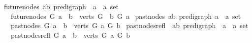 \begin{isabellebody}
\isanewline
{}\isamarkupfalse%
\ future{\isacharunderscore}{\kern0pt}nodes{\isacharcolon}{\kern0pt}{\isacharcolon}{\kern0pt}\ {\isachardoublequoteopen}{\isacharparenleft}{\kern0pt}{\isacharprime}{\kern0pt}a{\isacharcomma}{\kern0pt}{\isacharprime}{\kern0pt}b{\isacharparenright}{\kern0pt}\ pre{\isacharunderscore}{\kern0pt}digraph\ {\isasymRightarrow}\ {\isacharprime}{\kern0pt}a\ {\isasymRightarrow}\ {\isacharprime}{\kern0pt}a\ set{\isachardoublequoteclose}\isanewline
\ \ \ {\isachardoublequoteopen}future{\isacharunderscore}{\kern0pt}nodes\ G\ a\ {\isacharequal}{\kern0pt}\ {\isacharbraceleft}{\kern0pt}b\ {\isasymin}\ verts\ G{\isachardot}{\kern0pt}\ \ b\ {\isasymrightarrow}\isactrlsup {\isacharplus}{\kern0pt}\isactrlbsub G\isactrlesub \ a{\isacharbraceright}{\kern0pt}{\isachardoublequoteclose}\isanewline
\isanewline
{}\isamarkupfalse%
\ past{\isacharunderscore}{\kern0pt}nodes{\isacharcolon}{\kern0pt}{\isacharcolon}{\kern0pt}\ {\isachardoublequoteopen}{\isacharparenleft}{\kern0pt}{\isacharprime}{\kern0pt}a{\isacharcomma}{\kern0pt}{\isacharprime}{\kern0pt}b{\isacharparenright}{\kern0pt}\ pre{\isacharunderscore}{\kern0pt}digraph\ {\isasymRightarrow}{\isacharprime}{\kern0pt}a\ {\isasymRightarrow}\ {\isacharprime}{\kern0pt}a\ set{\isachardoublequoteclose}\isanewline
\ \ \ {\isachardoublequoteopen}past{\isacharunderscore}{\kern0pt}nodes\ G\ a\ {\isacharequal}{\kern0pt}\ {\isacharbraceleft}{\kern0pt}b\ {\isasymin}\ verts\ G{\isachardot}{\kern0pt}\ a\ {\isasymrightarrow}\isactrlsup {\isacharplus}{\kern0pt}\isactrlbsub G\isactrlesub \ b{\isacharbraceright}{\kern0pt}{\isachardoublequoteclose}\isanewline
\isanewline
{}\isamarkupfalse%
\ past{\isacharunderscore}{\kern0pt}nodes{\isacharunderscore}{\kern0pt}refl\ {\isacharcolon}{\kern0pt}{\isacharcolon}{\kern0pt}\ {\isachardoublequoteopen}{\isacharparenleft}{\kern0pt}{\isacharprime}{\kern0pt}a{\isacharcomma}{\kern0pt}{\isacharprime}{\kern0pt}b{\isacharparenright}{\kern0pt}\ pre{\isacharunderscore}{\kern0pt}digraph\ {\isasymRightarrow}\ {\isacharprime}{\kern0pt}a\ {\isasymRightarrow}\ {\isacharprime}{\kern0pt}a\ set{\isachardoublequoteclose}\isanewline
\ \ \ {\isachardoublequoteopen}past{\isacharunderscore}{\kern0pt}nodes{\isacharunderscore}{\kern0pt}refl\ G\ a\ {\isacharequal}{\kern0pt}\ {\isacharbraceleft}{\kern0pt}b\ {\isasymin}\ verts\ G{\isachardot}{\kern0pt}\ a\ {\isasymrightarrow}\isactrlsup {\isacharasterisk}{\kern0pt}\isactrlbsub G\isactrlesub \ b{\isacharbraceright}{\kern0pt}{\isachardoublequoteclose}\isanewline
\isanewline

\end{isabellebody}
